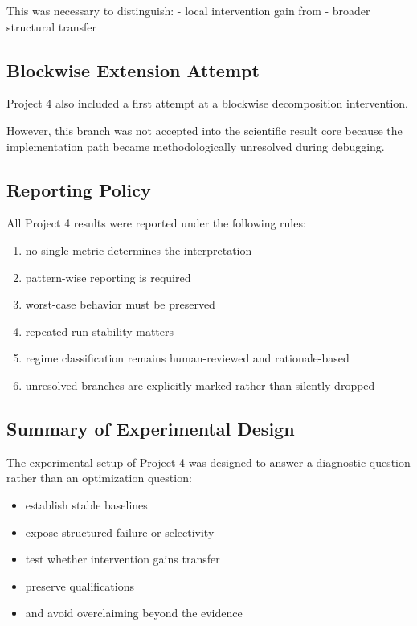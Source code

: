 \documentclass[11pt]{article}
\begin{document}
This was necessary to distinguish:
- local intervention gain
from
- broader structural transfer

\subsection{Blockwise Extension Attempt}

Project 4 also included a first attempt at a blockwise decomposition intervention.

However, this branch was not accepted into the scientific result core because the implementation path became methodologically unresolved during debugging.

\subsection{Reporting Policy}

All Project 4 results were reported under the following rules:
\begin{enumerate}[leftmargin=1.5em]
    \item no single metric determines the interpretation
    \item pattern-wise reporting is required
    \item worst-case behavior must be preserved
    \item repeated-run stability matters
    \item regime classification remains human-reviewed and rationale-based
    \item unresolved branches are explicitly marked rather than silently dropped
\end{enumerate}

\subsection{Summary of Experimental Design}

The experimental setup of Project 4 was designed to answer a diagnostic question rather than an optimization question:
\begin{itemize}[leftmargin=1.5em]
    \item establish stable baselines
    \item expose structured failure or selectivity
    \item test whether intervention gains transfer
    \item preserve qualifications
    \item and avoid overclaiming beyond the evidence
\end{itemize}
\end{document}
